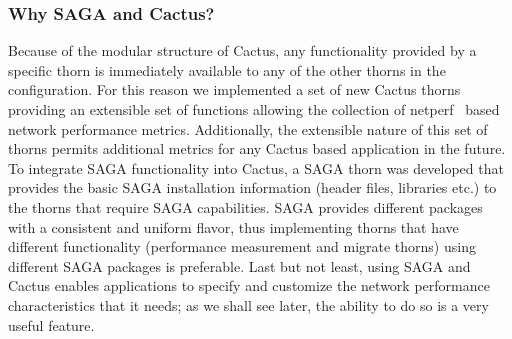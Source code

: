 \documentclass[conference,final]{IEEEtran}
\newcommand{\CC}{\ccomment}
\begin{document}


\subsubsection{Why SAGA and Cactus?} 

Because of the modular structure of Cactus, any functionality provided
by a specific thorn is immediately available to any of the other
thorns in the configuration. For this reason we implemented a set of
new Cactus thorns providing an extensible set of functions allowing
the collection of netperf~\cite{netperf_web} based network performance
metrics. Additionally, the extensible nature of this set of thorns
permits additional metrics for any Cactus based application in the
future.  To integrate SAGA functionality into Cactus, a SAGA thorn was
developed that provides the basic SAGA installation information
(header files, libraries etc.)  to the thorns that require SAGA
capabilities.  SAGA provides different packages with a consistent and
uniform flavor, thus implementing thorns that have different
functionality (performance measurement and migrate thorns) using
different SAGA packages is preferable. Last but not least, using SAGA
and Cactus enables applications to specify and customize the network
performance characteristics that it needs; as we shall see later, the
ability to do so is a very useful feature.

\end{document}
